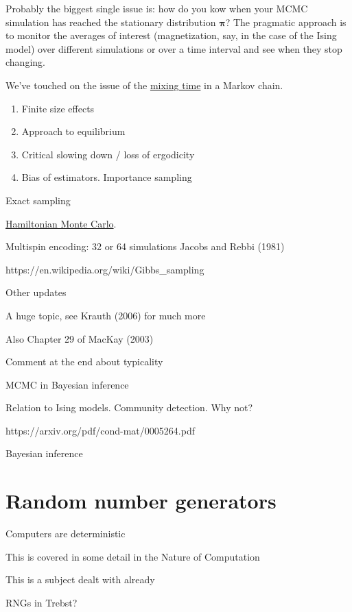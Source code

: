 \documentclass[
  letterpaper,
  DIV=11,
  numbers=noendperiod]{scrreprt}
\providecommand{\tightlist}{%
  \setlength{\itemsep}{0pt}\setlength{\parskip}{0pt}}\usepackage{longtable,booktabs,array}
\theoremstyle{definition}
\theoremstyle{remark}
\begin{document}
Probably the biggest single issue is: how do you kow when your MCMC
simulation has reached the stationary distribution \(\boldsymbol{\pi}\)?
The pragmatic approach is to monitor the averages of interest
(magnetization, say, in the case of the Ising model) over different
simulations or over a time interval and see when they stop changing.

We've touched on the issue of the
\href{https://en.wikipedia.org/wiki/Markov_chain_mixing_time}{mixing
time} in a Markov chain.

\begin{enumerate}
\def\labelenumi{\arabic{enumi}.}
\tightlist
\item
  Finite size effects
\item
  Approach to equilibrium
\item
  Critical slowing down / loss of ergodicity
\item
  Bias of estimators. Importance sampling
\end{enumerate}

Exact sampling

\href{https://en.wikipedia.org/wiki/Hamiltonian_Monte_Carlo}{Hamiltonian
Monte Carlo}.

Multispin encoding: 32 or 64 simulations Jacobs and Rebbi (1981)

https://en.wikipedia.org/wiki/Gibbs\_sampling

Other updates

A huge topic, see Krauth (2006) for much more

Also Chapter 29 of MacKay (2003)

Comment at the end about typicality

MCMC in Bayesian inference

Relation to Ising models. Community detection. Why not?

https://arxiv.org/pdf/cond-mat/0005264.pdf

Bayesian inference

\hypertarget{sec-rng}{%
\section{Random number generators}\label{sec-rng}}

Computers are deterministic

This is covered in some detail in the Nature of Computation

This is a subject dealt with already

RNGs in Trebst?
\end{document}
